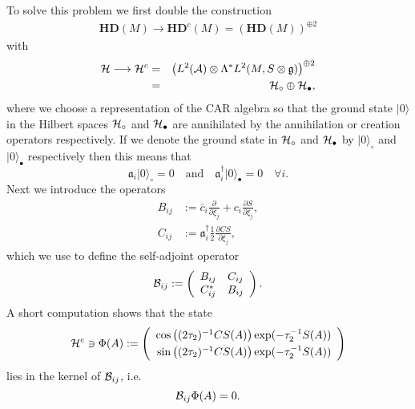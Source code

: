 \documentclass[letterpaper,11pt]{article}
\newcommand{\nn}{\nonumber}
\def\ca{{\cal A}}
\def\cb{{\cal B}}
\def\ch{{\cal H}}
\newcommand{\pa}{\partial}
\begin{document}
To solve this problem we first double the construction 
\begin{eqnarray}
\mathbf{HD}(M) \longrightarrow \mathbf{HD}^c(M) =  \left(\mathbf{HD}(M)\right)^{ \oplus 2}
\label{HDC}
\end{eqnarray}
with
\begin{eqnarray}
\ch \longrightarrow \ch^c &=& \left( L^2(\ca)   \otimes  \Lambda^* L^2(M,S\otimes\mathfrak{g}) \right)^{\oplus 2}
\nn\\
&=& \ch_\circ \oplus \ch_\bullet,
\label{HC}
\end{eqnarray}
where we choose a representation of the CAR algebra so that 
 the ground state $\vert 0 \rangle$ in the Hilbert spaces $\ch_\circ$ and $\ch_\bullet$ are annihilated by the annihilation or creation operators respectively. If we denote the ground state in $\ch_\circ$ and $\ch_\bullet$ by $\vert 0 \rangle_\circ$ and $\vert 0 \rangle_\bullet$ respectively then this means that
 \begin{equation}
 \mathfrak{a}_i\vert 0 \rangle_\circ=0
 \quad
 \mbox{and} 
 \quad
 \mathfrak{a}_i^\dagger\vert 0 \rangle_\bullet=0\quad \forall i.
 \label{Miami}
 \end{equation}
Next we introduce the operators 
\begin{align}
B_{ij} &:= \bar{c}_i \frac{\pa}{\pa \xi_j}  + c_i  \frac{\pa S }{\pa\xi_{j }},
\nn\\
 C_{ij}  &:=       \mathfrak{a}_i^\dagger  \frac{1}{2}   \frac{\pa CS }{\pa\xi_{j }}  ,
\end{align}
which we use to define the self-adjoint operator
\begin{eqnarray}
\cb_{ij} :=   \left(
\begin{array}{cc}
 B_{ij}  & C_{ij} \\ 
C^*_{ij}    &  B_{ij}
\end{array}
\right).
\label{BDx2}
\end{eqnarray}
A short computation shows that the state 
\begin{equation}
\ch^c \ni \Phi (A) := \left(
\begin{array}{r}
\cos \left(({2\tau_2})^{-1}   CS(A)\right) \exp(-\tau_2^{-1}S(A))  
\vspace{0,1cm}
\\
 \sin\left(({2\tau_2})^{-1}  CS(A)\right)  \exp(-\tau_2^{-1}S(A)) 
\end{array}
\right) 
\label{platter}
\end{equation}
lies in the kernel of $\cb_{ij}$, i.e.
\begin{equation}
\cb_{ij} \Phi(A) = 0.
\label{T1}
\end{equation}
\end{document}
